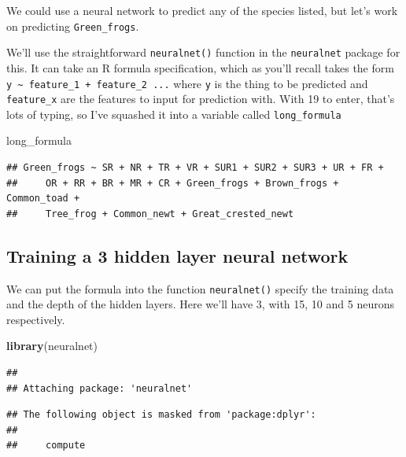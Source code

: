 \documentclass[
]{book}
\newenvironment{Shaded}{\begin{snugshade}}{\end{snugshade}}
\newcommand{\KeywordTok}[1]{\textcolor[rgb]{0.13,0.29,0.53}{\textbf{#1}}}
\newcommand{\NormalTok}[1]{#1}
\begin{document}
We could use a neural network to predict any of the species listed, but let's work on predicting \texttt{Green\_frogs}.

We'll use the straightforward \texttt{neuralnet()} function in the \texttt{neuralnet} package for this. It can take an R formula specification, which as you'll recall takes the form \texttt{y\ \textasciitilde{}\ feature\_1\ +\ feature\_2\ ...} where \texttt{y} is the thing to be predicted and \texttt{feature\_x} are the features to input for prediction with. With 19 to enter, that's lots of typing, so I've squashed it into a variable called \texttt{long\_formula}

\begin{Shaded}
\begin{Highlighting}[]
\NormalTok{long_formula}
\end{Highlighting}
\end{Shaded}

\begin{verbatim}
## Green_frogs ~ SR + NR + TR + VR + SUR1 + SUR2 + SUR3 + UR + FR + 
##     OR + RR + BR + MR + CR + Green_frogs + Brown_frogs + Common_toad + 
##     Tree_frog + Common_newt + Great_crested_newt
\end{verbatim}

\hypertarget{training-a-3-hidden-layer-neural-network}{%
\subsection{Training a 3 hidden layer neural network}\label{training-a-3-hidden-layer-neural-network}}

We can put the formula into the function \texttt{neuralnet()} specify the training data and the depth of the hidden layers. Here we'll have 3, with 15, 10 and 5 neurons respectively.

\begin{Shaded}
\begin{Highlighting}[]
\KeywordTok{library}\NormalTok{(neuralnet)}
\end{Highlighting}
\end{Shaded}

\begin{verbatim}
## 
## Attaching package: 'neuralnet'
\end{verbatim}

\begin{verbatim}
## The following object is masked from 'package:dplyr':
## 
##     compute
\end{verbatim}
\end{document}
